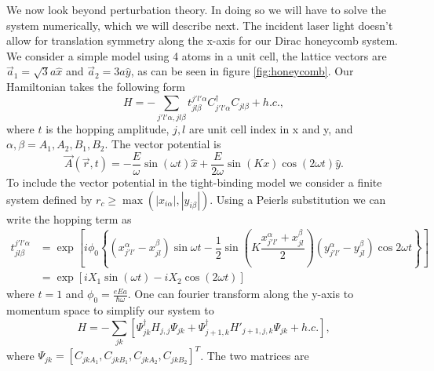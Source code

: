 We now look beyond perturbation theory.
In doing so we will have to solve the system numerically, which we will describe next.
The incident laser light doesn't allow for translation symmetry along the x-axis for our Dirac honeycomb system.
We consider a simple model using 4 atoms in a unit cell, the lattice vectors are $\vec{a}_1 = \sqrt{3}a\hat{x}$ and $\vec{a}_2 = 3a\hat{y}$, as can be seen in figure \ref{fig:honeycomb}.
Our Hamiltonian takes the following form
\begin{equation}
  H = -\sum_{j'l'\alpha,jl\beta} t^{j'l'\alpha}_{jl\beta} C^{\dagger}_{j'l'\alpha} C_{jl\beta} + h.c.,
\end{equation}
where $t$ is the hopping amplitude, $j,l$ are unit cell index in x and y, and $\alpha,\beta = A_1, A_2, B_1, B_2$.
The vector potential is
\begin{equation}
  \vec{A}(\vec{r},t) = -\dfrac{E}{\omega} \sin{(\omega t)} \hat{x} + \dfrac{E}{2\omega} \sin{(Kx)} \cos{(2\omega t)} \hat{y}.
\end{equation}
To include the vector potential in the tight-binding model we consider a finite system defined by $r_c \geq \max(|x_{i\alpha}|,|y_{i\beta}|)$.
Using a Peierls substitution we can write the hopping term as
\begin{align}
t^{j'l'\alpha}_{jl\beta} &= \exp\left[ i \phi_0 \left\{ (x_{j'l'}^{\alpha} - x_{jl}^{\beta}) \sin{\omega t} - \dfrac{1}{2} \sin\left(K \dfrac{x_{j'l'}^{\alpha} + x_{jl}^{\beta}}{2} \right) (y_{j'l'}^{\alpha} - y_{jl}^{\beta}) \cos{2\omega t}  \right\} \right] \nonumber \\
  &= \exp\left[ i X_1 \sin(\omega t) -i X_2 \cos(2\omega t)\right]
\end{align}
where $t=1$ and $\phi_0 = \frac{e E a}{\hbar \omega}$.
One can fourier transform along the y-axis to momentum space to simplify our system to
\begin{equation}
  H = -\sum_{jk} \left[ \Psi^{\dagger}_{jk} H_{j,j} \Psi_{jk} + \Psi^{\dagger}_{j+1,k} H'_{j+1,j,k} \Psi_{jk} + h.c. \right],
\end{equation}
where $\Psi_{jk} = [C_{jkA_1}, C_{jkB_1}, C_{jkA_2}, C_{jkB_2}]^T$. The two matrices are
